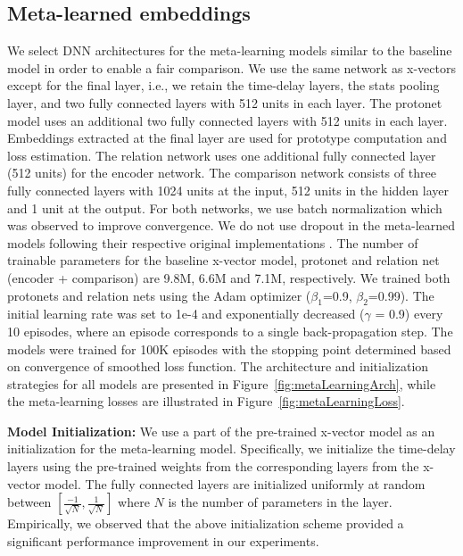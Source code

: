 \subsection{Meta-learned embeddings}
\label{subsec:training_details}


We select DNN architectures for the meta-learning models similar to the baseline model in order to enable a fair comparison. %
We use the same network as x-vectors except for the final layer, i.e., we retain the time-delay layers, the stats pooling layer, and two fully connected layers with 512 units in each layer. 
The protonet model uses an additional two fully connected layers with 512 units in each layer. Embeddings extracted at the final layer are used for prototype computation and loss estimation. The relation network uses one additional fully connected layer (512 units) for the encoder network. The comparison network consists of three fully connected layers with 1024 units at the input, 512 units in the hidden layer and 1 unit at the output. 
For both networks, we use batch normalization which was observed to improve convergence. We do not use dropout in the meta-learned models following their respective original implementations \cite{snell2017prototypical,sung2018learning}. The number of trainable parameters for the baseline x-vector model, protonet and relation net (encoder + comparison) are 9.8M, 6.6M and 7.1M, respectively. 
We trained both protonets and relation nets using the Adam optimizer ($\beta_1$=0.9, $\beta_2$=0.99). The initial learning rate was set to 1e-4 and exponentially decreased ($\gamma$ = 0.9) every 10 episodes, where an episode corresponds to a single back-propagation step. The models were trained for 100K episodes with the stopping point determined based on convergence of smoothed loss function. The architecture and initialization strategies for all models are presented in Figure~\ref{fig:metaLearningArch}, while the meta-learning losses are illustrated in Figure~\ref{fig:metaLearningLoss}.

\textbf{Model Initialization:}
We use a part of the pre-trained x-vector model as an initialization for the meta-learning model. 
Specifically, we initialize the time-delay layers using the pre-trained weights from the corresponding layers from the x-vector model.
The fully connected layers are initialized uniformly at random between $[\frac{-1}{\sqrt{N}}, \frac{1}{\sqrt{N}}]$ where $N$ is the number of parameters in the layer. Empirically, we observed that the above initialization scheme provided a significant performance improvement in our experiments. 

